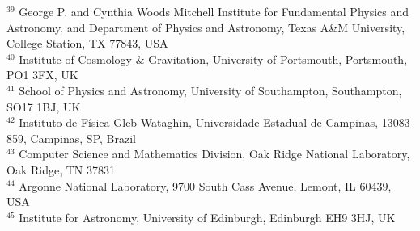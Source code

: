 $^{39}$ George P. and Cynthia Woods Mitchell Institute for Fundamental Physics and Astronomy, and Department of Physics and Astronomy, Texas A\&M University, College Station, TX 77843,  USA\\
$^{40}$ Institute of Cosmology \& Gravitation, University of Portsmouth, Portsmouth, PO1 3FX, UK\\
$^{41}$ School of Physics and Astronomy, University of Southampton,  Southampton, SO17 1BJ, UK\\
$^{42}$ Instituto de F\'isica Gleb Wataghin, Universidade Estadual de Campinas, 13083-859, Campinas, SP, Brazil\\
$^{43}$ Computer Science and Mathematics Division, Oak Ridge National Laboratory, Oak Ridge, TN 37831\\
$^{44}$ Argonne National Laboratory, 9700 South Cass Avenue, Lemont, IL 60439, USA\\
$^{45}$ Institute for Astronomy, University of Edinburgh, Edinburgh EH9 3HJ, UK\\
